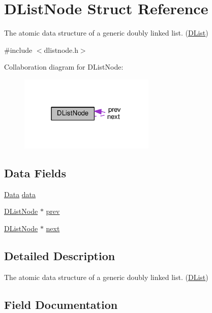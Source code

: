 \hypertarget{structDListNode}{}\section{D\+List\+Node Struct Reference}
\label{structDListNode}


The atomic data structure of a generic doubly linked list. (\hyperlink{structDList}{D\+List})  




{\ttfamily \#include $<$dlistnode.\+h$>$}



Collaboration diagram for D\+List\+Node\+:\nopagebreak
\begin{figure}[H]
\begin{center}
\leavevmode
\includegraphics[width=183pt]{structDListNode__coll__graph}
\end{center}
\end{figure}
\subsection*{Data Fields}
\begin{DoxyCompactItemize}
\item 
\hyperlink{basic_8h_a5f051eaa796886555205c751e6d530f4}{Data} \hyperlink{structDListNode_aae5a2c880ddfb133d04d97910f356e6b}{data}
\item 
\hyperlink{structDListNode}{D\+List\+Node} $\ast$ \hyperlink{structDListNode_af52bb1206b2228c7e47eb5ecd5dbb38d}{prev}
\item 
\hyperlink{structDListNode}{D\+List\+Node} $\ast$ \hyperlink{structDListNode_af9d7a8fe9c70f6836aba009163392fcc}{next}
\end{DoxyCompactItemize}


\subsection{Detailed Description}
The atomic data structure of a generic doubly linked list. (\hyperlink{structDList}{D\+List}) 

\subsection{Field Documentation}
